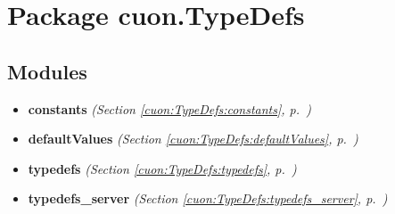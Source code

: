 %
%
%


\section{Package cuon.TypeDefs}

    \label{cuon:TypeDefs}


\subsection{Modules}

\begin{itemize}
\setlength{\parskip}{0ex}
\item \textbf{constants}
  \textit{(Section \ref{cuon:TypeDefs:constants}, p.~\pageref{cuon:TypeDefs:constants})}

\item \textbf{defaultValues}
  \textit{(Section \ref{cuon:TypeDefs:defaultValues}, p.~\pageref{cuon:TypeDefs:defaultValues})}

\item \textbf{typedefs}
  \textit{(Section \ref{cuon:TypeDefs:typedefs}, p.~\pageref{cuon:TypeDefs:typedefs})}

\item \textbf{typedefs\_server}
  \textit{(Section \ref{cuon:TypeDefs:typedefs_server}, p.~\pageref{cuon:TypeDefs:typedefs_server})}

\end{itemize}

